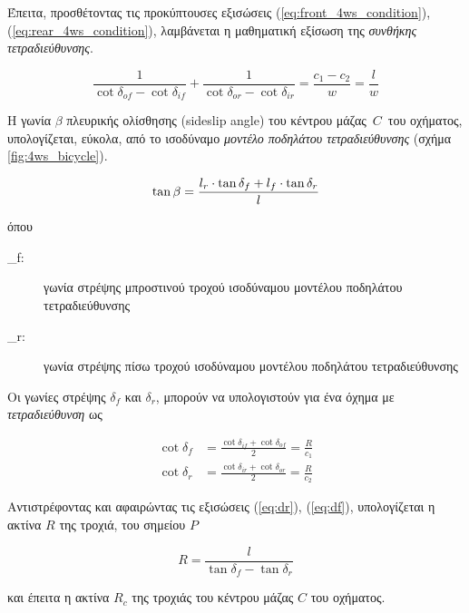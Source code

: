 {\noindent
Έπειτα, προσθέτοντας τις προκύπτουσες εξισώσεις (\ref{eq:front_4ws_condition}), (\ref{eq:rear_4ws_condition}), λαμβάνεται η μαθηματική εξίσωση της \textit{συνθήκης τετραδιεύθυνσης}.

\begin{equation}
	\frac{1}{\cot{\delta_{of}} - \cot{\delta_{if}}} + \frac{1}{\cot{\delta_{or}} - \cot{\delta_{ir}}} = \frac{c_1 - c_2}{w} = \frac{l}{w}
	\label{eq:4ws_condition}
\end{equation}


\bigskip\bigskip
H γωνία $\beta$ πλευρικής ολίσθησης (sideslip angle) \cite{automated_odometry} του κέντρου μάζας $\,C\,$ του οχήματος, υπολογίζεται, εύκολα, από το ισοδύναμο \textit{μοντέλο ποδηλάτου τετραδιεύθυνσης} (σχήμα \ref{fig:4ws_bicycle}).

\begin{equation}
	\tan{\beta} = \frac{l_r \cdot \tan{\delta_f} + l_f \cdot \tan{\delta_r}}{l}
	\label{eq:neg_4ws_beta}\\
\end{equation} 

\noindent
όπου
\begin{description}
	\item[\delta_f:] γωνία στρέψης μπροστινού τροχού ισοδύναμου μοντέλου ποδηλάτου τετραδιεύθυνσης
	\item[\delta_r:] γωνία στρέψης πίσω τροχού ισοδύναμου μοντέλου ποδηλάτου τετραδιεύθυνσης
\end{description}

\bigskip
Οι γωνίες στρέψης $\delta_f$ και $\delta_r$, μπορούν να υπολογιστούν για ένα όχημα με \textit{τετραδιεύθυνση} ως

\begin{align}
	\cot{\delta_f} &= \frac{\cot{\delta_{if}} + \cot{\delta_{of}}}{2} = \frac{R}{c_1}
	\label{eq:df}\\
	\cot{\delta_r} &= \frac{\cot{\delta_{ir}} + \cot{\delta_{or}}}{2} = \frac{R}{c_2}
	\label{eq:dr}
\end{align}

\bigskip
Αντιστρέφοντας και αφαιρώντας τις εξισώσεις (\ref{eq:dr}), (\ref{eq:df}), υπολογίζεται η ακτίνα $R$ της τροχιά, του σημείου $P$

\begin{equation}
	R = \frac{l}{\tan{\delta_f} - \tan{\delta_r}}
	\label{eq:pos_p_turning_radius}
\end{equation}


\bigskip
\noindent
και έπειτα η ακτίνα $R_c$ της τροχιάς του κέντρου μάζας $C$ του οχήματος.

}
